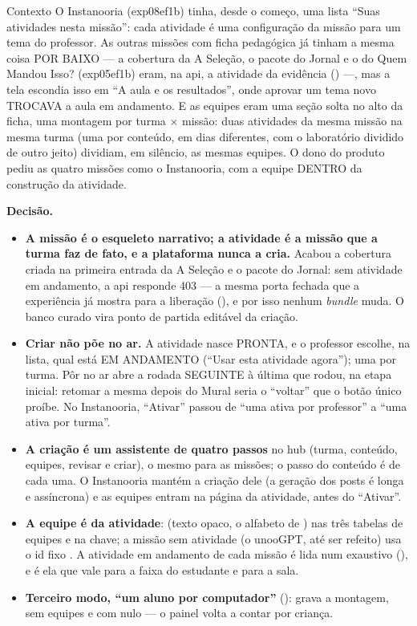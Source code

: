 \begin{especificacao}{Contexto}
O Instanooria (exp08ef1b) tinha, desde o começo, uma lista \enquote{Suas
atividades nesta missão}: cada atividade é uma configuração da missão para um
tema do professor. As outras missões com ficha pedagógica já tinham a mesma
coisa POR BAIXO --- a cobertura da A Seleção, o pacote do Jornal e o do Quem
Mandou Isso? (exp05ef1b) eram, na api, a atividade da evidência ()
---, mas a tela escondia isso em \enquote{A aula e os resultados}, onde aprovar
um tema novo TROCAVA a aula em andamento. E as equipes eram uma seção solta no
alto da ficha, uma montagem por turma $\times$ missão: duas atividades da mesma
missão na mesma turma (uma por conteúdo, em dias diferentes, com o laboratório
dividido de outro jeito) dividiam, em silêncio, as mesmas equipes. O dono do
produto pediu as quatro missões como o Instanooria, com a equipe DENTRO da
construção da atividade.
\end{especificacao}

\textbf{Decisão.}

\begin{itemize}
  \item \textbf{A missão é o esqueleto narrativo; a atividade é a missão que a
    turma faz de fato, e a plataforma nunca a cria.} Acabou a cobertura
     criada na primeira entrada da A Seleção e o pacote 
    do Jornal: sem atividade em andamento, a api responde 403
     --- a mesma porta fechada que a experiência já
    mostra para a liberação (), e por isso nenhum \emph{bundle}
    muda. O banco curado vira ponto de partida editável da criação.
  \item \textbf{Criar não põe no ar.} A atividade nasce PRONTA, e o professor
    escolhe, na lista, qual está EM ANDAMENTO (\enquote{Usar esta atividade
    agora}); uma por turma. Pôr no ar abre a rodada SEGUINTE à última que rodou,
    na etapa inicial: retomar a mesma depois do Mural seria o \enquote{voltar}
    que o botão único proíbe. No Instanooria, \enquote{Ativar} passou de
    \enquote{uma ativa por professor} a \enquote{uma ativa por turma}.
  \item \textbf{A criação é um assistente de quatro passos} no hub (turma,
    conteúdo, equipes, revisar e criar), o mesmo para as missões; o passo do
    conteúdo é de cada uma. O Instanooria mantém a criação dele (a geração dos
    posts é longa e assíncrona) e as equipes entram na página da atividade,
    antes do \enquote{Ativar}.
  \item \textbf{A equipe é da atividade}:  (texto opaco, o
    alfabeto de ) nas três tabelas de equipes e na chave;
    a missão sem atividade (o unooGPT, até ser refeito) usa o id fixo
    . A atividade em andamento de cada missão é lida num
     exaustivo (), e é ela que vale para a
    faixa do estudante e para a sala.
  \item \textbf{Terceiro modo, \enquote{um aluno por computador}}
    (): grava a montagem, sem equipes e com 
    nulo --- o painel volta a contar por criança.
\end{itemize}

